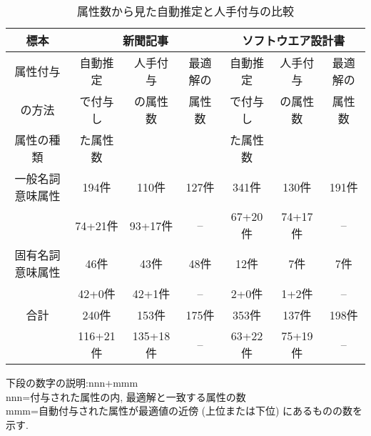 \begin{table}[htbp]
  \caption{属性数から見た自動推定と人手付与の比較}
  \label{tab:6}
\vspace{-2mm} 
  \begin{center}
    \leavevmode
    \begin{tabular}{|c|c|c|c|c|c|c|}
      \hline
      標本 & \multicolumn{3}{|c|}{新聞記事} & \multicolumn{3}{|c|}{ソフトウエア設計書} \\ \hline
      属性付与 & 自動推定 & 人手付与 & 最適解の & 自動推定 & 人手付与 & 最適解の \\
      の方法 & で付与し & の属性数 & 属性数 & で付与し & の属性数 & 属性数 \\ \cline{1-1}
      属性の種類 & た属性数 & & & た属性数 & & \\ \hline
      一般名詞意味属性 & 194件 & 110件 & 127件 & 341件 & 130件 & 191件 \\
      & 74+21件 & 93+17件 & -- & 67+20件 & 74+17件 & -- \\ \hline
      固有名詞意味属性 & 46件 & 43件 & 48件 & 12件 & 7件 & 7件 \\
      & 42+0件 & 42+1件 & -- & 2+0件 & 1+2件 & -- \\ \hline
      合計 & 240件 & 153件 & 175件 & 353件 & 137件 & 198件 \\
      & 116+21件 & 135+18件 & -- & 63+22件 & 75+19件 & -- \\ \hline
    \end{tabular}

    \vspace{1.3mm} 下段の数字の説明:nnn+mmm\\
    nnn=付与された属性の内, 最適解と一致する属性の数\\
    mmm=自動付与された属性が最適値の近傍 (上位または下位) にあるものの数を示す. 
\vspace{-2mm} 
  \end{center}
\end{table}
 
